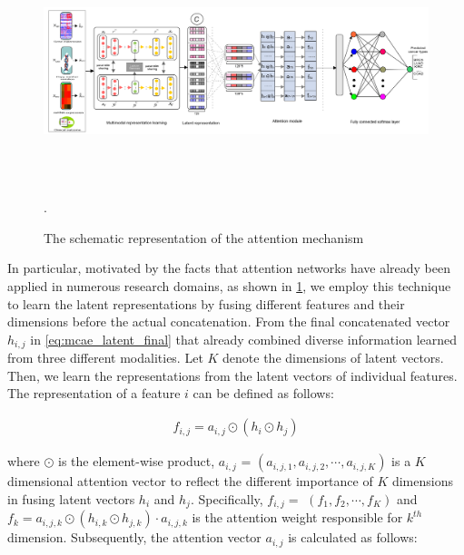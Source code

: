 \begin{figure}[htp!]
	\centering
	\includegraphics[width=\textwidth,height=65mm]{images/attention.png}	\caption{The schematic representation of the attention mechanism}.	
    \vspace{-2mm}
	\label{fig:attention}
\end{figure}

\hspace*{3.5mm}In particular, motivated by the facts that attention networks have already been applied in numerous research domains, as shown in \cref{fig:attention}, we employ this technique to learn the latent representations by fusing different features and their dimensions before the actual concatenation. From the final concatenated vector $h_{i,j}$ in \cref{eq:mcae_latent_final} that already combined diverse information learned from three different modalities. Let $K$ denote the dimensions of latent vectors. Then, we learn the representations from the latent vectors of individual features. The representation of a feature $i$ can be defined as follows:

\vspace{-6mm}
\begin{align}
    f_{i,j}=a_{i,j} \odot\left(h_{i} \odot h_{j}\right)
\end{align}
\vspace{-6mm}

\hspace*{3.5mm} where $\odot$ is the element-wise product, $a_{i,j}$ = $\left(a_{i,j,1}, a_{i,j,2}, \cdots, a_{i,j,K}\right)$ is a $K$ dimensional attention vector to reflect the different importance of $K$ dimensions in fusing latent vectors $h_{i}$ and $h_{j}$.  Specifically, $f_{i,j}=$ $\left(f_{1}, f_{2}, \cdots, f_{K}\right)$ and $f_{k}=a_{i,j,k} \odot\left(h_{i,k} \odot h_{j,k}\right) \cdot a_{i,j,k}$ is the attention weight responsible for $k^{th}$ dimension. Subsequently, the attention vector $a_{i,j}$ is calculated as follows: 
 
